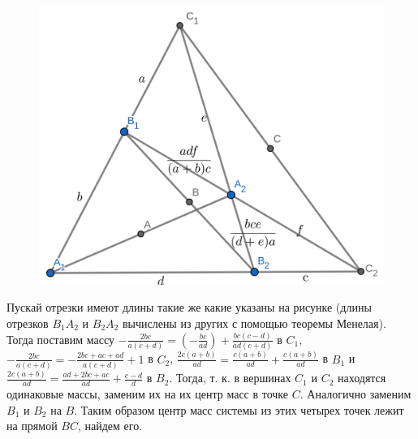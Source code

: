 \begin{figure}
\includegraphics[width=\linewidth]{tasks/Гаусс жив.png}
\end{figure}

Пускай отрезки имеют длины такие же какие указаны на рисунке (длины отрезков $B_1A_2$ и $B_2A_2$ вычислены из других с помощью теоремы Менелая). Тогда поставим массу $-\frac{2bc}{a(c+d)} =(-\frac{bc}{ad}) +  \frac{bc(c-d)}{ad(c+d)}$ в $C_1$,
$-\frac{2bc}{a(c+d)} = -\frac{2bc+ac+ad}{a(c+d)} + 1$ в $C_2$,
$\frac{2c(a+b)}{ad} = \frac{c(a+b)}{ad} + \frac{c(a+b)}{ad}$ в  $B_1$
и $\frac{2c(a+b)}{ad} = \frac{ad+2bc+ac}{ad} + \frac{c-d}{d}$ в $B_2$. Тогда, т. к. в вершинах $C_1$ и  $C_2$ находятся одинаковые массы, заменим их на их центр масс в точке $C$. Аналогично заменим $B_1$ и  $B_2$ на $B$. Таким образом центр масс системы из этих четырех точек лежит на прямой $BC$, найдем его. 

